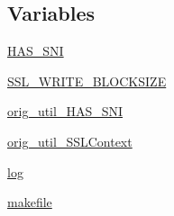 \subsection*{Variables}
\begin{DoxyCompactItemize}
\item 
\hyperlink{namespacepip_1_1__vendor_1_1urllib3_1_1contrib_1_1pyopenssl_abc41ee2400478d9be7fcc9ff2a226048}{H\+A\+S\+\_\+\+S\+NI}
\item 
\hyperlink{namespacepip_1_1__vendor_1_1urllib3_1_1contrib_1_1pyopenssl_ad88b30458265f2cd0753d55b912b1b7a}{S\+S\+L\+\_\+\+W\+R\+I\+T\+E\+\_\+\+B\+L\+O\+C\+K\+S\+I\+ZE}
\item 
\hyperlink{namespacepip_1_1__vendor_1_1urllib3_1_1contrib_1_1pyopenssl_a8f3f024f2958a25b6bccdf6df042742e}{orig\+\_\+util\+\_\+\+H\+A\+S\+\_\+\+S\+NI}
\item 
\hyperlink{namespacepip_1_1__vendor_1_1urllib3_1_1contrib_1_1pyopenssl_a5b03545e439f496ef7afbeab7b4653aa}{orig\+\_\+util\+\_\+\+S\+S\+L\+Context}
\item 
\hyperlink{namespacepip_1_1__vendor_1_1urllib3_1_1contrib_1_1pyopenssl_a32b1a563572e6b61e68a4ef285bd3769}{log}
\item 
\hyperlink{namespacepip_1_1__vendor_1_1urllib3_1_1contrib_1_1pyopenssl_a4aa7606b03a4ffd67153cf13157a523d}{makefile}
\end{DoxyCompactItemize}



